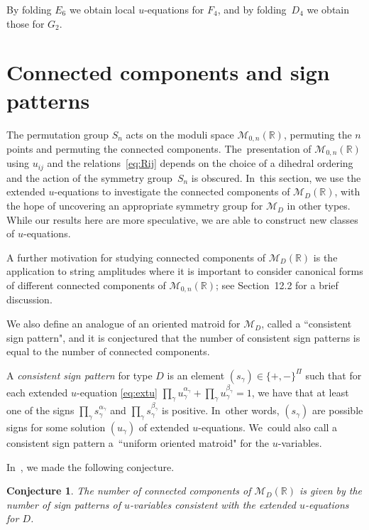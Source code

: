 \documentclass[10pt,a4paper]{amsart}
\def\R{{\mathbb R}}
\def\M{{\mathcal{M}}}
\numberwithin{equation}{section}
\newtheorem{Conjecture}[Theorem]{Conjecture}
 { \theoremstyle{definition}
\newtheorem{Definition}[Theorem]{Definition}
\newtheorem{Example}[Theorem]{Example}
\newtheorem{Remark}[Theorem]{Remark}
\newtheorem{question}[Theorem]{Question}
\newtheorem{problem}[Theorem]{Problem}}
\begin{document}
\medskip{} By folding $E_6$ we obtain local $u$-equations for $F_4$, and by folding~$D_4$ we obtain those for $G_2$.

\section{Connected components and sign patterns} \label{sec:conn}

The permutation group $S_n$ acts on the moduli space $\M_{0,n}(\R)$, permuting the $n$ points and permuting the connected components. The~presentation of $\M_{0,n}(\R)$ using $u_{ij}$ and the relations~\eqref{eq:Rij} depends on the choice of a dihedral ordering and the action of the symmetry group~$S_n$ is obscured. In~this section, we use the extended $u$-equations to investigate the connected components of $\M_D(\R)$, with the hope of uncovering an appropriate symmetry group for $\M_D$ in other types. While our results here are more speculative, we are able to construct new classes of $u$-equations.

A further motivation for studying connected components of $\M_D(\R)$ is the application to string amplitudes where it is important to consider canonical forms of different connected components of $\M_{0,n}(\R)$; see Section~12.2 for a brief discussion.

We also define an analogue of an oriented matroid for $\M_D$, called a ``consistent sign pattern", and it is conjectured that the number of consistent sign patterns is equal to the number of connected components.

\bigskip{}
A \emph{consistent sign pattern} for type $D$ is an element $(s_\gamma) \in \{+,-\}^\Pi$ such that for each extended $u$-equation \eqref{eq:extu} $\prod_\gamma u_\gamma^{\alpha_\gamma} + \prod_\gamma u_\gamma^{\beta_\gamma} =1$, we have that at least one of the signs $\prod_\gamma s_\gamma^{\alpha_\gamma}$ and $\prod_\gamma s_\gamma^{\beta_\gamma}$ is positive. In~other words, $(s_\gamma)$ are possible signs for some solution $(u_\gamma)$ of extended $u$-equations. We~could also call a consistent sign pattern a~``uniform oriented matroid" for the $u$-variables.

In~\cite{AHLT}, we made the following conjecture.

\begin{Conjecture} The number of connected components of $\M_D(\R)$ is given by the number of sign patterns of $u$-variables consistent with the extended $u$-equations for $D$.
\end{Conjecture}
\end{document}
